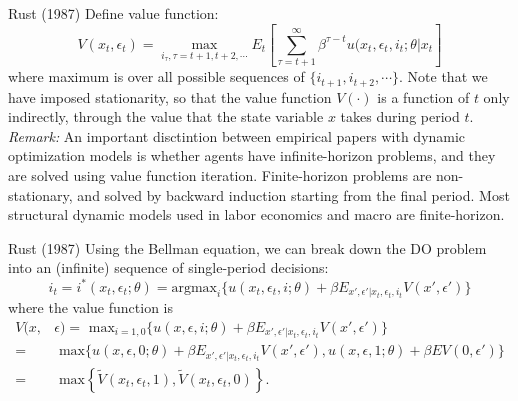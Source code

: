 \documentclass[xcolor=pdftex,dvipsnames,table,mathserif]{beamer}
\begin{document}
\begin{frame}{Rust (1987)}
Define value function:
\begin{equation*}
V(x_t, \epsilon_t) = \max_{i_{\tau}, \tau = t+1, t+2, \cdots} E_t \left [ \sum^{\infty}_{\tau=t+1} \beta^{\tau-t} u(x_t, \epsilon_t, i_t;\theta | x_t \right ]
\end{equation*}
where maximum is over all possible sequences of $\{ i_{t+1}, i_{t+2}, \cdots\}$. Note that we have imposed stationarity, so that the value function $V(\cdot)$ is a function of $t$ only indirectly, through the value that the state variable $x$ takes during period $t$. \\
\vspace{2mm}
\emph{Remark:} An important disctintion between empirical papers with dynamic optimization models is whether agents have infinite-horizon problems, and they are solved using value function iteration. Finite-horizon problems are non-stationary, and solved by backward induction starting from the final period. Most structural dynamic models used in labor economics and macro are finite-horizon. 
\end{frame}

\begin{frame}{Rust (1987)}
Using the Bellman equation, we can break down the DO problem into an (infinite) sequence of single-period decisions:
\begin{equation*}
i_t = i^{*} (x_t, \epsilon_t; \theta) = \text{argmax}_i \{u(x_t, \epsilon_t, i ; \theta) + \beta E_{x', \epsilon ' | x_t, \epsilon_t, i_t} V(x', \epsilon ') \}
\end{equation*}
where the value function is 
\begin{equation*}
\begin{split}
V(x, & \epsilon) = \text{ max}_{i = 1, 0} \{ u(x, \epsilon, i; \theta) + \beta E_{x', \epsilon ' | x_t, \epsilon_t, i_t} V(x', \epsilon ') \}\\
= & \text{ max} \{u(x, \epsilon, 0; \theta) + \beta E_{x', \epsilon ' | x_t, \epsilon_t, i_t} V(x', \epsilon '), u(x, \epsilon, 1; \theta) + \beta E V(0, \epsilon ') \} \\
= & \text{ max} \left\{ \tilde V (x_t, \epsilon_t, 1), \tilde V (x_t, \epsilon_t, 0) \right \} .
\end{split}
\end{equation*}
\end{frame}
\end{document}
